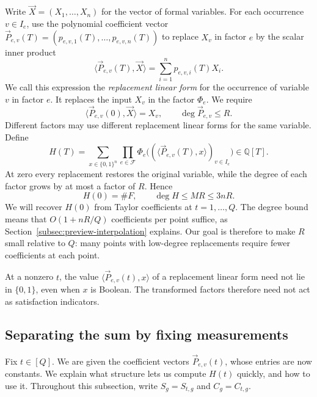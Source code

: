 Write $\vec{X}=(X_1,\ldots,X_n)$ for the vector of formal variables.
For each occurrence $v\in I_e$, use the polynomial coefficient vector
$\vec{P}_{e,v}(T)=(p_{e,v,1}(T),\ldots,p_{e,v,n}(T))$ to replace
$X_v$ in factor $e$ by the scalar inner product
\[
 \langle \vec{P}_{e,v}(T),\vec{X}\rangle
 =\sum_{i=1}^n p_{e,v,i}(T)X_i.
\]
We call this expression the \emph{replacement linear form} for
the occurrence of variable $v$ in factor $e$. It replaces the
input $X_v$ in the factor $\Phi_e$.
We require
\[
 \langle \vec{P}_{e,v}(0),\vec{X}\rangle=X_v,
 \qquad \deg \vec{P}_{e,v}\le R.
\]
Different factors may use different replacement linear forms
for the same variable.
Define
\begin{equation}\label{eq:simple-counting-polynomial}
 H(T)=\sum_{x\in\{0,1\}^n}\prod_{e\in\mathcal F}
       \Phi_e\bigl((\langle \vec{P}_{e,v}(T), x\rangle)_{v\in I_e}\bigr)
       \in\mathbb Q[T].
\end{equation}
At zero every replacement restores the original variable, while
the degree of each factor grows by at most a factor of $R$. Hence
\begin{equation}\label{eq:overview-value-degree}
 H(0)=\#F,\qquad \deg H\le MR\le3nR.
\end{equation}
We will recover $H(0)$ from Taylor coefficients at $t=1,\ldots,Q$.
The degree bound means that $O(1+nR/Q)$ coefficients per point
suffice, as Section~\ref{subsec:preview-interpolation} explains.
Our goal is therefore to make $R$ small relative to $Q$: many
points with low-degree replacements require fewer coefficients
at each point.

At a nonzero $t$, the value $\langle\vec{P}_{e,v}(t),x\rangle$
of a replacement linear form need not lie in $\{0,1\}$, even
when $x$ is Boolean. The transformed factors
therefore need not act as satisfaction indicators.

\subsection{Separating the sum by fixing measurements}
\label{subsec:preview-separation}
Fix $t\in[Q]$. We are given the coefficient vectors
$\vec{P}_{e,v}(t)$, whose entries are now constants. We explain
what structure lets us compute $H(t)$ quickly, and how to use it.
Throughout this subsection, write $S_g=S_{t,g}$ and $C_g=C_{t,g}$.

